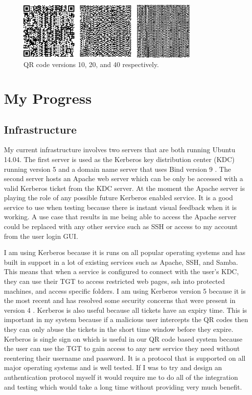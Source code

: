 \documentclass[]{report}   %
\begin{document}
\begin{figure}[H]
\centering
\includegraphics[width=9cm]{QRCodes.png}
\caption{QR code versions 10, 20, and 40 respectively.}
\end{figure}

\section{My Progress}
\subsection{Infrastructure} 
My current infrastructure involves two servers that are both running Ubuntu 14.04. The first server is used as the Kerberos key distribution center (KDC) running version 5 and a domain name server that uses Bind version 9 \cite{Bind}. The second server hosts an Apache web server which can be only be accessed with a valid Kerberos ticket from the KDC server. At the moment the Apache server is playing the role of any possible future Kerberos enabled service. It is a good service to use when testing because there is instant visual feedback when it is working. A use case that results in me being able to access the Apache server could be replaced with any other service such as SSH or access to my account from the user login GUI.

I am using Kerberos because it is runs on all popular operating systems and has built in support in a lot of existing services such as Apache, SSH, and Samba. This means that when a service is configured to connect with the user's KDC, they can use their TGT to access restricted web pages, ssh into protected machines, and access specific folders. I am using Kerberos version 5 because it is the most recent and has resolved some security concerns that were present in version 4 \cite{KerbUpdate}. Kerberos is also useful because all tickets have an expiry time. This is important in my system because if a malicious user intercepts the QR codes then they can only abuse the tickets in the short time window before they expire. Kerberos is single sign on which is useful in our QR code based system because the user can use the TGT to gain access to any new service they need without reentering their username and password. It is a protocol that is supported on all major operating systems and is well tested. If I was to try and design an authentication protocol myself it would require me to do all of the integration and testing which would take a long time without providing very much benefit.
\end{document}

